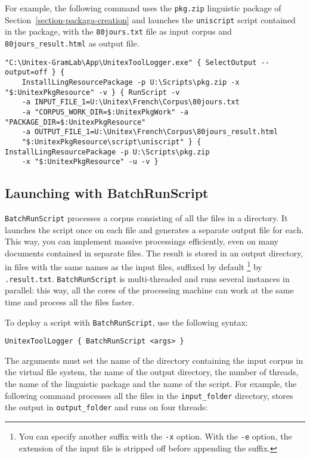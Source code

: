 \noindent For example, the following command uses the \verb$pkg.zip$ linguistic package of
Section~\ref{section-packaga-creation} and launches the 
 \verb$uniscript$ script contained in the package, with the \verb$80jours.txt$ file as input corpus
and \verb$80jours_result.html$ as output file.

\begin{Verbatim}[fontsize=\small,fontfamily=helvetica]
"C:\Unitex-GramLab\App\UnitexToolLogger.exe" { SelectOutput --output=off } {
    InstallLingResourcePackage -p U:\Scripts\pkg.zip -x "$:UnitexPkgResource" -v } { RunScript -v
    -a INPUT_FILE_1=U:\Unitex\French\Corpus\80jours.txt 
    -a "CORPUS_WORK_DIR=$:UnitexPkgWork" -a "PACKAGE_DIR=$:UnitexPkgResource"
    -a OUTPUT_FILE_1=U:\Unitex\French\Corpus\80jours_result.html 
    "$:UnitexPkgResource\script\uniscript" } { InstallLingResourcePackage -p U:\Scripts\pkg.zip 
    -x "$:UnitexPkgResource" -u -v }
\end{Verbatim}



\subsection{Launching with BatchRunScript}
\label{launch-script}

\verb$BatchRunScript$ processes a corpus consisting of all the files in a directory.
It launches the script once on each file and generates a separate output file for each.
This way, you can implement massive processings efficiently, even on many documents
contained in separate files. The result is stored in an output directory, in files
with the same names as the input files, suffixed by default \footnote{You can specify
another suffix with the \texttt{-x} option. With the \texttt{-e} option, the extension
of the input file is stripped off before appending the suffix.} by \verb$.result.txt$.
\verb$BatchRunScript$ is multi-threaded and runs several instances in parallel: this way,
all the cores of the processing machine can work at the same time and process all the files faster.

\bigskip
\noindent To deploy a script with \verb$BatchRunScript$, use the following syntax:

\begin{verbatim}
UnitexToolLogger { BatchRunScript <args> }
\end{verbatim}

\noindent The arguments must set the name of the directory containing the input corpus
in the virtual file system, the name of the output directory, the number of threads, the name
of the linguistic package and the name of the script. For example, the following command processes
all the files in the \verb$input_folder$ directory, stores the output in \verb$output_folder$ and runs
on four threads:

